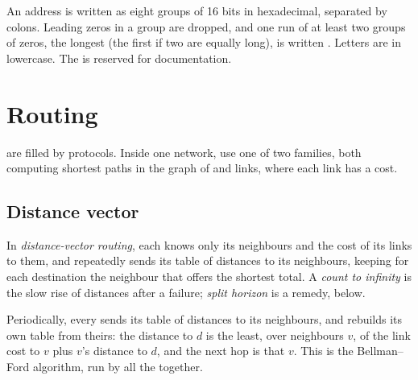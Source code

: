 An address is written as eight groups of 16 bits in hexadecimal, separated by colons. Leading zeros in a group are
dropped, and one run of at least two groups of zeros, the longest (the first if two are equally long), is written
\code{::}. Letters are in lowercase. The   is reserved for documentation.


\section{Routing}\label{sec:b2:network-layer:routing}

 are filled by  protocols. Inside one network,  use one of two families, both
computing shortest paths in the graph of  and links, where each link has a cost.

\subsection{Distance vector}

\begin{definition}\label{def:b2:network-layer:dv}
In \emph{distance-vector routing}, each  knows only its neighbours and the cost of
its links to them, and repeatedly sends its table of distances to its neighbours, keeping for each destination the
neighbour that offers the shortest total. A \emph{count to infinity} is the slow rise of distances after a failure;
\emph{split horizon} is a remedy, below.
\end{definition}

 Periodically, every  sends its table of distances to its neighbours, and rebuilds its own
table from theirs: the distance to $d$ is the least, over neighbours $v$, of the link cost to $v$ plus $v$'s distance
to $d$, and the next hop is that $v$. This is the Bellman--Ford algorithm, run by all the  together.


